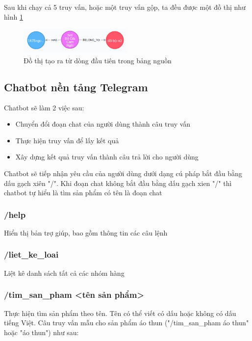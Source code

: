 \bigskip

Sau khi chạy cả 5 truy vấn, hoặc một truy vấn gộp, ta đều được một đồ thị như hình \ref{fig:cypher} 

\begin{figure}[h]
\centering
\includegraphics[width=0.5\textwidth]{imagev2/merge5cypher.png}
\caption{\label{fig:cypher} Đồ thị tạo ra từ dòng đầu tiên trong bảng nguồn}
\end{figure}

\subsection{Chatbot nền tảng Telegram}

Chatbot sẽ làm 2 việc sau: 

\begin{itemize}
\item Chuyển đổi đoạn chat của người dùng thành câu truy vấn 
\item Thực hiện truy vấn để lấy kết quả 
\item Xây dựng kết quả truy vấn thành câu trả lời cho người dùng 
\end{itemize}

Chatbot sẽ tiếp nhận yêu cầu của người dùng dưới dạng cú pháp bắt đầu bằng dấu gạch xiên "/". Khi đoạn chat không bắt đầu bằng dấu gạch xien "/" thì chatbot tự hiểu là tìm sản phẩm có tên là đoạn chat 

\subsubsection{/help} 
Hiển thị bản trợ giúp, bao gồm thông tin các câu lệnh

\subsubsection{/liet\_ke\_loai}
Liệt kê danh sách tất cả các nhóm hàng 

\subsubsection{/tim\_san\_pham <tên sản phẩm>}
Thực hiện tìm sản phẩm theo tên. Tên có thể viết có dấu hoặc không có dấu tiếng Việt. 
Câu truy vấn mẫu cho sản phẩm áo thun ("/tim\_san\_pham áo thun" hoặc "áo thun") như sau: 

